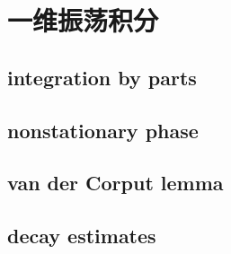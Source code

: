 \section{一维振荡积分}
\label{b2:sec:2101}


\subsection{integration by parts}
\label{b2:subsec:210101}

\subsection{nonstationary phase}
\label{b2:subsec:210102}

\subsection{van der Corput lemma}
\label{b2:subsec:210103}

\subsection{decay estimates}
\label{b2:subsec:210104}


